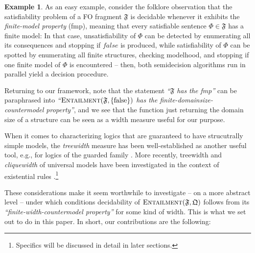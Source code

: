 \documentclass[10pt,a4paper]{amsart}
\theoremstyle{definition}
\newtheorem{exa}[exa]{Example}
\numberwithin{equation}{section}
\theoremstyle{plain}
\theoremstyle{definition}
\newtheorem{example}[example]{Example}
\theoremstyle{myexample}
\renewenvironment{example}%
{
	\begin{shaded*}	
		\vspace{-1.5ex}
		\begin{exa}%
		}{
		\end{exa}
		\vspace{-1.5ex}
	\end{shaded*}
}
\theoremstyle{plain}
\theoremstyle{definition}
\begin{document}
\begin{example} As an easy example, consider the folklore observation that the satisfiability problem of a FO fragment $\mathfrak{F}$ is decidable whenever it exhibits the \emph{finite-model property} (fmp), meaning that every satisfiable sentence $\Phi \in \mathfrak{F}$ has a finite model: In that case, unsatisfiability of $\Phi$ can be detected by enumerating all its consequences and stopping if $\mathit{false}$ is produced, while satisfiability of $\Phi$ can be spotted by enumerating all finite structures, checking modelhood, and stopping if one finite model of $\Phi$ is encountered -- then, both semidecision algorithms run in parallel yield a decision procedure.

Returning to our framework, note that the statement \textsl{``$\mathfrak{F}$ has the fmp''} can be paraphrased into \textsl{``$\textsc{Entailment}(\mathfrak{F},\{\mathrm{false}\})$ has the finite-domainsize-countermodel property''}, and we see that the function just returning the domain size of a structure can be seen as a width measure useful for our purpose. 
\end{example}

When it comes to characterizing logics that are guaranteed to have strucutrally simple models, the \emph{treewidth} measure \cite{ROBERTSON198449} has been well-established as another useful tool, e.g., for logics of the guarded family \cite{AndrekaNB98,Gradel99}. More recently, treewidth and \emph{cliquewidth} of universal models have been investigated in the context of existential rules \cite{BagLecMugSal11,CaliGK13,ICDT2023}.\footnote{Specifics will be discussed in detail in later sections.}  

\medskip

These considerations make it seem worthwhile to investigate -- on a more abstract level -- under which conditions decidability of $\textsc{Entailment}(\mathfrak{F},\mathfrak{Q})$ follows from its \textsl{``finite-width-countermodel property''} for some kind of width. This is what we set out to do in this paper. In short, our contributions are the following:
\end{document}
